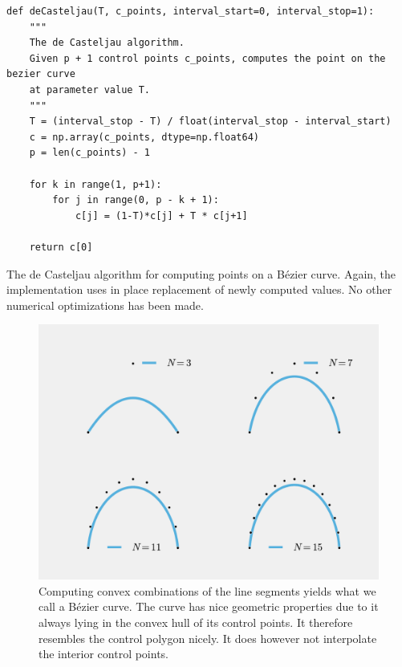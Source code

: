 \documentclass{article}
\begin{document}
    \begin{listing}
        \begin{verbatim}
def deCasteljau(T, c_points, interval_start=0, interval_stop=1):
    """
    The de Casteljau algorithm.
    Given p + 1 control points c_points, computes the point on the bezier curve
    at parameter value T.
    """
    T = (interval_stop - T) / float(interval_stop - interval_start)
    c = np.array(c_points, dtype=np.float64)
    p = len(c_points) - 1

    for k in range(1, p+1):
        for j in range(0, p - k + 1):
            c[j] = (1-T)*c[j] + T * c[j+1]

    return c[0]
        \end{verbatim} 
        \caption{The de Casteljau algorithm for computing points on a B\'ezier
        curve. Again, the implementation uses in place replacement of newly
    computed values. No other numerical optimizations has been made.}
        \label{lst:decasteljau}
    \end{listing}

    \begin{figure}[htpb]
        \centering
        \includegraphics[width=0.8\linewidth]{bezier.pdf}
        \caption{Computing convex combinations of the line segments yields what
            we call a B\'ezier curve. The curve has nice geometric properties
            due to it always lying in the convex hull of its control points. It
            therefore resembles the control polygon nicely. It does however not
            interpolate the interior control points.}
        \label{fig:bezier}
    \end{figure}
\end{document}

